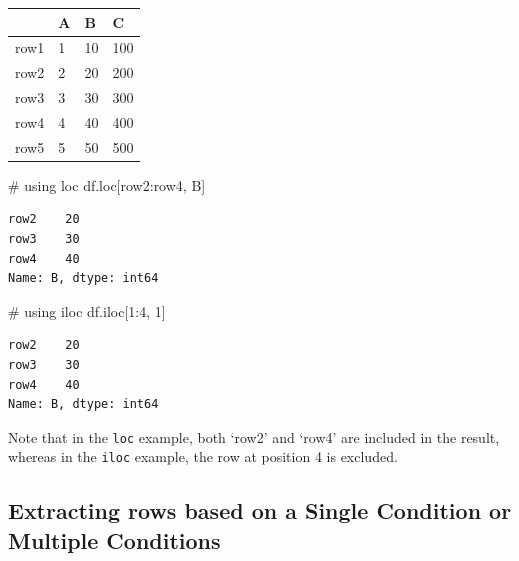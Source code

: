 \documentclass[
  letterpaper,
  DIV=11,
  numbers=noendperiod]{scrreprt}
\newenvironment{Shaded}{\begin{snugshade}}{\end{snugshade}}
\newcommand{\CommentTok}[1]{\textcolor[rgb]{0.37,0.37,0.37}{#1}}
\newcommand{\DecValTok}[1]{\textcolor[rgb]{0.68,0.00,0.00}{#1}}
\newcommand{\NormalTok}[1]{\textcolor[rgb]{0.00,0.23,0.31}{#1}}
\newcommand{\StringTok}[1]{\textcolor[rgb]{0.13,0.47,0.30}{#1}}
\begin{document}
\begin{longtable}[]{@{}llll@{}}
\toprule\noalign{}
& A & B & C \\
\midrule\noalign{}
\endhead
\bottomrule\noalign{}
\endlastfoot
row1 & 1 & 10 & 100 \\
row2 & 2 & 20 & 200 \\
row3 & 3 & 30 & 300 \\
row4 & 4 & 40 & 400 \\
row5 & 5 & 50 & 500 \\
\end{longtable}

\begin{Shaded}
\begin{Highlighting}[]
\CommentTok{\# using \textquotesingle{}loc\textquotesingle{}}
\NormalTok{df.loc[}\StringTok{\textquotesingle{}row2\textquotesingle{}}\NormalTok{:}\StringTok{\textquotesingle{}row4\textquotesingle{}}\NormalTok{, }\StringTok{\textquotesingle{}B\textquotesingle{}}\NormalTok{]}
\end{Highlighting}
\end{Shaded}

\begin{verbatim}
row2    20
row3    30
row4    40
Name: B, dtype: int64
\end{verbatim}

\begin{Shaded}
\begin{Highlighting}[]

\CommentTok{\# using \textquotesingle{}iloc\textquotesingle{}}
\NormalTok{df.iloc[}\DecValTok{1}\NormalTok{:}\DecValTok{4}\NormalTok{, }\DecValTok{1}\NormalTok{]}
\end{Highlighting}
\end{Shaded}

\begin{verbatim}
row2    20
row3    30
row4    40
Name: B, dtype: int64
\end{verbatim}

Note that in the \texttt{loc} example, both `row2' and `row4' are
included in the result, whereas in the \texttt{iloc} example, the row at
position 4 is excluded.

\hypertarget{extracting-rows-based-on-a-single-condition-or-multiple-conditions}{%
\subsection{Extracting rows based on a Single Condition or Multiple
Conditions}\label{extracting-rows-based-on-a-single-condition-or-multiple-conditions}}
\end{document}
